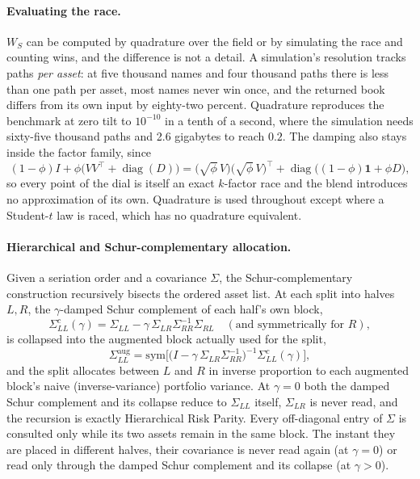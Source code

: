 \documentclass[11pt]{article}
\begin{document}
\paragraph{Evaluating the race.} $W_S$ can be computed by quadrature over the
field or by simulating the race and counting wins, and the difference is not a
detail. A simulation's resolution tracks paths \emph{per asset}: at five
thousand names and four thousand paths there is less than one path per asset,
most names never win once, and the returned book differs from its own input by
eighty-two percent. Quadrature reproduces the benchmark at zero tilt to
$10^{-10}$ in a tenth of a second, where the simulation needs sixty-five
thousand paths and 2.6 gigabytes to reach $0.2$. The damping also stays inside
the factor family, since
\[
  (1-\phi) I + \phi \big( V V^\top + \operatorname{diag}(D) \big)
  = \big(\sqrt{\phi}\,V\big)\big(\sqrt{\phi}\,V\big)^\top
    + \operatorname{diag}\big((1-\phi)\mathbf 1 + \phi D\big),
\]
so every point of the dial is itself an exact $k$-factor race and the blend
introduces no approximation of its own. Quadrature is used throughout except
where a Student-$t$ law is raced, which has no quadrature equivalent.

\paragraph{Hierarchical and Schur-complementary allocation.} Given a
seriation order and a covariance $\Sigma$, the Schur-complementary
construction \parencite{cotton2024schur} recursively bisects the ordered
asset list. At each split into halves $L,R$, the $\gamma$-damped Schur
complement of each half's own block,
\[
  \Sigma_{LL}^c(\gamma) = \Sigma_{LL} - \gamma\,\Sigma_{LR}\Sigma_{RR}^{-1}\Sigma_{RL}
  \quad(\text{and symmetrically for } R),
\]
is collapsed into the augmented block actually used for the split,
\[
  \Sigma_{LL}^{\mathrm{aug}} = \mathrm{sym}\Big[\big(I - \gamma\,\Sigma_{LR}\Sigma_{RR}^{-1}\big)^{-1}\Sigma_{LL}^c(\gamma)\Big],
\]
and the split allocates between $L$ and $R$ in inverse proportion to each
augmented block's naive (inverse-variance) portfolio variance. At $\gamma=0$
both the damped Schur complement and its collapse reduce to $\Sigma_{LL}$
itself, $\Sigma_{LR}$ is never read, and the recursion is exactly
Hierarchical Risk Parity. Every off-diagonal entry of $\Sigma$ is consulted
only while its two assets remain in the same block. The instant they are
placed in different halves, their covariance is never read again (at
$\gamma=0$) or read only through the damped Schur complement and its
collapse (at $\gamma>0$).
\end{document}

